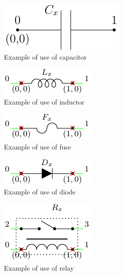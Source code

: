 \documentclass[a4paper,12pt]{report}
\begin{document}
\begin{figure}[h]
\centering
\includegraphics{capacitorInfo}
\caption{Example of use of capacitor}
\label{capaciorInfo} %
\end{figure}

\begin{figure}[h]
\centering
\includegraphics{inductorInfo}
\caption{Example of use of inductor}
\label{inductorInfo} %
\end{figure}

\begin{figure}[h]
\centering
\includegraphics{fuseInfo}
\caption{Example of use of fuse}
\label{fuseInfo} %
\end{figure}

\begin{figure}[h]
\centering
\includegraphics{diodeInfo}
\caption{Example of use of diode}
\label{diodeInfo} %
\end{figure}

\begin{figure}[h]
\centering
\includegraphics{relayInfo}
\caption{Example of use of relay}
\label{relayInfo} %
\end{figure}
\end{document}
